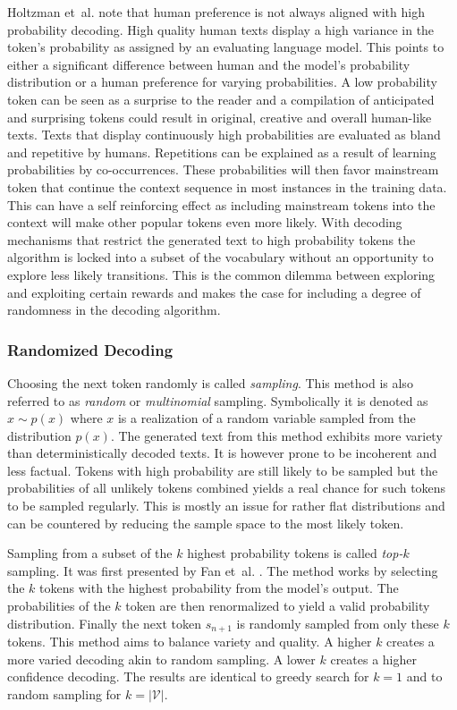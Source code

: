     Holtzman et~al. \cite{holtzman2020curious} note that human preference is not always aligned with high probability decoding.
    High quality human texts display a high variance in the token's probability as assigned by an evaluating language model.
    This points to either a significant difference between human and the model's probability distribution or a human preference for varying probabilities.
    A low probability token can be seen as a surprise to the reader and a compilation of anticipated and surprising tokens could result in original, creative and overall human-like texts.
    Texts that display continuously high probabilities are evaluated as bland and repetitive by humans.
    Repetitions can be explained as a result of learning probabilities by co-occurrences.
    These probabilities will then favor mainstream token that continue the context sequence in most instances in the training data.
    This can have a self reinforcing effect as including mainstream tokens into the context will make other popular tokens even more likely.
    With decoding mechanisms that restrict the generated text to high probability tokens the algorithm is locked into a subset of the vocabulary without an opportunity to explore less likely transitions.
    This is the common dilemma between exploring and exploiting certain rewards and makes the case for including a degree of randomness in the decoding algorithm.  

    \subsubsection{Randomized Decoding}
    Choosing the next token randomly is called \emph{sampling}.
    This method is also referred to as \emph{random} or \emph{multinomial} sampling.
    Symbolically it is denoted as $x \sim p(x)$ where $x$ is a realization of a random variable sampled from the distribution $p(x)$. 
    The generated text from this method exhibits more variety than deterministically decoded texts.
    It is however prone to be incoherent and less factual.
    Tokens with high probability are still likely to be sampled but the probabilities of all unlikely tokens combined yields a real chance for such tokens to be sampled regularly.
    This is mostly an issue for rather flat distributions and can be countered by reducing the sample space to the most likely token.

    Sampling from a subset of the $k$ highest probability tokens is called \emph{top-$k$} sampling.
    It was first presented by Fan et~al. \cite{fan2018hierarchical}.
    The method works by selecting the $k$ tokens with the highest probability from the model's output.
    The probabilities of the $k$ token are then renormalized to yield a valid probability distribution.
    Finally the next token $s_{n+1}$ is randomly sampled from only these $k$ tokens.
    This method aims to balance variety and quality.
    A higher $k$ creates a more varied decoding akin to random sampling.
    A lower $k$ creates a higher confidence decoding.
    The results are identical to greedy search for $k=1$ and to random sampling for $k=|\mathcal{V}|$.


